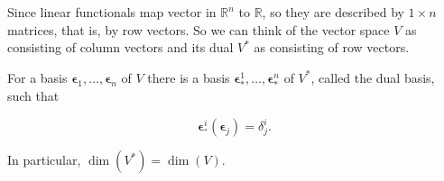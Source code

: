 \documentclass[a4paper,12pt]{report}
\begin{document}
Since linear functionals map vector in \(\mathbb{R}^{n} \) to \(\mathbb{R}\), so they are described by \(1 \times n\) matrices, that is, by row vectors. So we can think of the vector space \(V\) as consisting of column vectors and its dual \(V^*\) as consisting of row vectors. 

\begin{theorem}
    For a basis \(\boldsymbol{\epsilon }_{1} , \ldots , \boldsymbol{\epsilon  }_{n}   \) of \(V\) there is a basis \(\boldsymbol{\epsilon }_{*}^{1}  , \ldots , \boldsymbol{\epsilon }_{*}^{n}    \) of \(V^*\), called the dual basis, such that 
    
    \begin{equation}
        \boldsymbol{\epsilon }_{^*}^{i}  (\boldsymbol{\epsilon }_{j} ) = \delta ^{i} _{j} .  
    \end{equation}

    In particular, \(\dim (V^*) = \dim (V)\). 
\end{theorem}
\end{document}
